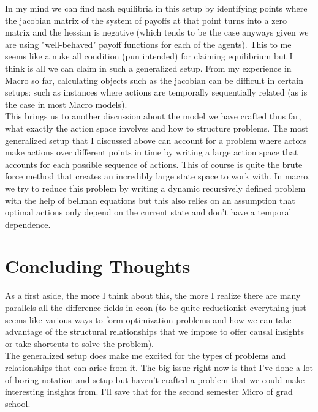 \documentclass[11pt,english]{article}
\begin{document}
\noindent In my mind we can find nash equilibria in this setup by identifying points where the jacobian matrix of the system of payoffs at that point turns into a zero matrix and the hessian is negative (which tends to be the case anyways given we are using "well-behaved" payoff functions for each of the agents). This to me seems like a nuke all condition (pun intended) for claiming equilibrium but I think is all we can claim in such a generalized setup. From my experience in Macro so far, calculating objects such as the jacobian can be difficult in certain setups: such as instances where actions are temporally sequentially related (as is the case in most Macro models). \\

\noindent This brings us to another discussion about the model we have crafted thus far, what exactly the action space involves and how to structure problems. The most generalized setup that I discussed above can account for a problem where actors make actions over different points in time by writing a large action space that accounts for each possible sequence of actions. This of course is quite the brute force method that creates an incredibly large state space to work with. In macro, we try to reduce this problem by writing a dynamic recursively defined problem with the help of bellman equations but this also relies on an assumption that optimal actions only depend on the current state and don't have a temporal dependence.
\section*{Concluding Thoughts}
As a first aside, the more I think about this, the more I realize there are many parallels all the difference fields in econ (to be quite reductionist everything just seems like various ways to form optimization problems and how we can take advantage of the structural relationships that we impose to offer causal insights or take shortcuts to solve the problem).\\

\noindent The generalized setup does make me excited for the types of problems and relationships that can arise from it. The big issue right now is that I've done a lot of boring notation and setup but haven't crafted a problem that we could make interesting insights from. I'll save that for the second semester Micro of grad school.
\end{document}
